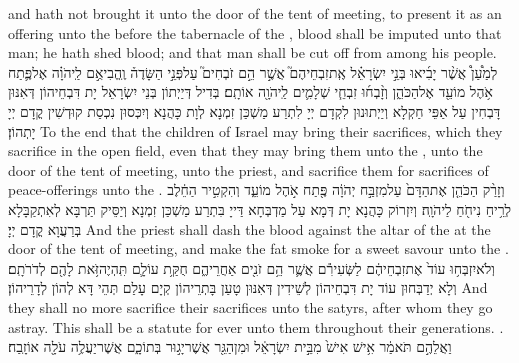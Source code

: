{and hath not brought it unto the door of the tent of meeting, to present it as an offering unto the \lord\space before the tabernacle of the \lord, blood shall be imputed unto that man; he hath shed blood; and that man shall be cut off from among his people.}{}
{לְמַ֩עַן֩ אֲשֶׁ֨ר יָבִ֜יאוּ בְּנֵ֣י יִשְׂרָאֵ֗ל אֶֽת\maqqaf זִבְחֵיהֶם֮ אֲשֶׁ֣ר הֵ֣ם זֹבְחִים֮ עַל\maqqaf פְּנֵ֣י הַשָּׂדֶה֒ וֶֽהֱבִיאֻ֣ם לַֽיהֹוָ֗ה אֶל\maqqaf פֶּ֛תַח אֹ֥הֶל מוֹעֵ֖ד אֶל\maqqaf הַכֹּהֵ֑ן וְזָ֨בְח֜וּ זִבְחֵ֧י שְׁלָמִ֛ים לַֽיהֹוָ֖ה אוֹתָֽם׃}
{בְּדִיל דְּיַיְתוֹן בְּנֵי יִשְׂרָאֵל יָת דִּבְחֵיהוֹן דְּאִנּוּן דָּבְחִין עַל אַפֵּי חַקְלָא וְיַיְתוּנוּן לִקְדָם יְיָ לִתְרַע מַשְׁכַּן זִמְנָא לְוָת כָּהֲנָא וְיִכְּסוּן נִכְסַת קוּדְשִׁין קֳדָם יְיָ יָתְהוֹן׃}
{To the end that the children of Israel may bring their sacrifices, which they sacrifice in the open field, even that they may bring them unto the \lord, unto the door of the tent of meeting, unto the priest, and sacrifice them for sacrifices of peace-offerings unto the \lord.}{}
{וְזָרַ֨ק הַכֹּהֵ֤ן אֶת\maqqaf הַדָּם֙ עַל\maqqaf מִזְבַּ֣ח יְהֹוָ֔ה פֶּ֖תַח אֹ֣הֶל מוֹעֵ֑ד וְהִקְטִ֣יר הַחֵ֔לֶב לְרֵ֥יחַ נִיחֹ֖חַ לַיהֹוָֽה׃}
{וְיִזְרוֹק כָּהֲנָא יָת דְּמָא עַל מַדְבְּחָא דַּייָ בִּתְרַע מַשְׁכַּן זִמְנָא וְיַסֵּיק תַּרְבָּא לְאִתְקַבָּלָא בְּרַעֲוָא קֳדָם יְיָ׃}
{And the priest shall dash the blood against the altar of the \lord\space at the door of the tent of meeting, and make the fat smoke for a sweet savour unto the \lord.}{}
{וְלֹא\maqqaf יִזְבְּח֥וּ עוֹד֙ אֶת\maqqaf זִבְחֵיהֶ֔ם לַשְּׂעִירִ֕ם אֲשֶׁ֛ר הֵ֥ם זֹנִ֖ים אַחֲרֵיהֶ֑ם חֻקַּ֥ת עוֹלָ֛ם תִּֽהְיֶה\maqqaf זֹּ֥את לָהֶ֖ם לְדֹרֹתָֽם׃}
{וְלָא יְדַבְּחוּן עוֹד יָת דִּבְחֵיהוֹן לְשֵׁידִין דְּאִנּוּן טָעַן בָּתְרֵיהוֹן קְיָם עָלַם תְּהֵי דָּא לְהוֹן לְדָרֵיהוֹן׃}
{And they shall no more sacrifice their sacrifices unto the satyrs, after whom they go astray. This shall be a statute for ever unto them throughout their generations. .}{}
{וַאֲלֵהֶ֣ם תֹּאמַ֔ר אִ֥ישׁ אִישׁ֙ מִבֵּ֣ית יִשְׂרָאֵ֔ל וּמִן\maqqaf הַגֵּ֖ר אֲשֶׁר\maqqaf יָג֣וּר בְּתוֹכָ֑ם אֲשֶׁר\maqqaf יַעֲלֶ֥ה עֹלָ֖ה אוֹ\maqqaf זָֽבַח׃}
